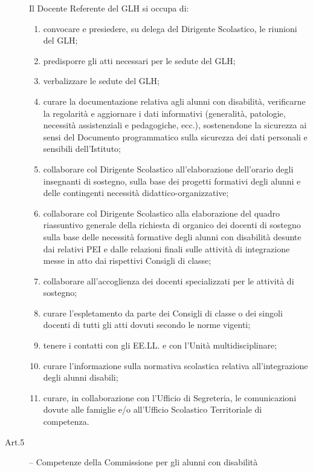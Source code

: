 \begin{description}
	Il Docente Referente del GLH si occupa di:
	\begin{enumerate}
		\item  convocare e presiedere, su delega del Dirigente Scolastico, le riunioni del GLH;
		\item predisporre gli atti necessari per le sedute del GLH;
		\item verbalizzare le sedute del GLH;
		\item curare la documentazione relativa agli alunni con disabilità, verificarne la regolarità e aggiornare
		i dati informativi (generalità, patologie, necessità assistenziali e pedagogiche, ecc.), sostenendone la
		sicurezza ai sensi del Documento programmatico sulla sicurezza dei dati personali e sensibili
		dell'Istituto;
		\item collaborare col Dirigente Scolastico all'elaborazione dell'orario degli insegnanti di sostegno,
		sulla base dei progetti formativi degli alunni e delle contingenti necessità didattico-organizzative;
		\item collaborare col Dirigente Scolastico alla elaborazione del quadro riassuntivo generale della
		richiesta di organico dei docenti di sostegno sulla base delle necessità formative degli alunni con
		disabilità desunte dai relativi PEI e dalle relazioni finali sulle attività di integrazione messe in atto
		dai rispettivi Consigli di classe;
		\item collaborare all'accoglienza dei docenti specializzati per le attività di sostegno;
		\item curare l'espletamento da parte dei Consigli di classe o dei singoli docenti di tutti gli atti dovuti
		secondo le norme vigenti;
		\item tenere i contatti con gli EE.LL. e con l'Unità multidisciplinare;
		\item curare l'informazione sulla normativa scolastica relativa all'integrazione degli alunni disabili;
		\item  curare, in collaborazione con l'Ufficio di Segreteria, le comunicazioni dovute alle famiglie e/o
		all'Ufficio Scolastico Territoriale di competenza.
	\end{enumerate}
	\item [Art.5] -- Competenze della Commissione per gli alunni con disabilità
	

\end{description}
